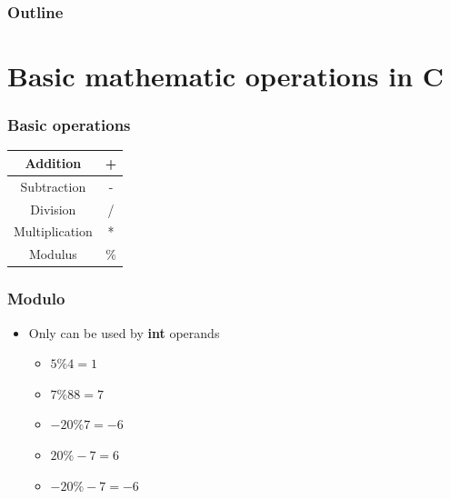 \documentclass{../c-lecture}
\subtitle{Calculation}
\begin{document}
\begin{frame}
  \titlepage{}
\end{frame}
\begin{frame}
  \frametitle{Outline}
  \tableofcontents{}
\end{frame}

\section{Basic mathematic operations in C}

\begin{frame}
  \frametitle{Basic operations}
  \begin{table}
  \begin{tabular}{cc}
    \toprule

    Addition &
    +\\

    \midrule

    Subtraction &
    - \\

    \midrule

    Division &
    / \\

    \midrule

    Multiplication &
    * \\

    \midrule

    Modulus &
    \% \\

    \bottomrule
  \end{tabular}
  \end{table}
\end{frame}

\begin{frame}
  \frametitle{Modulo}
  \begin{itemize}
    \item Only can be used by \textbf{\color{Orange} int} operands
    \begin{itemize}
      \item $5 \% 4 = 1$
      \item $7 \% 88 = 7$
      \item $-20 \% 7 = -6$
      \item $20 \% -7 = 6$
      \item $-20 \% -7 = -6$
    \end{itemize}
  \end{itemize}
\end{frame}
\end{document}
